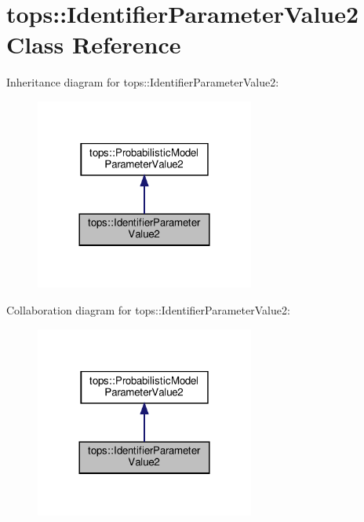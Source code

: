 \hypertarget{classtops_1_1IdentifierParameterValue2}{}\section{tops\+:\+:Identifier\+Parameter\+Value2 Class Reference}
\label{classtops_1_1IdentifierParameterValue2}


Inheritance diagram for tops\+:\+:Identifier\+Parameter\+Value2\+:
\nopagebreak
\begin{figure}[H]
\begin{center}
\leavevmode
\includegraphics[width=204pt]{classtops_1_1IdentifierParameterValue2__inherit__graph}
\end{center}
\end{figure}


Collaboration diagram for tops\+:\+:Identifier\+Parameter\+Value2\+:
\nopagebreak
\begin{figure}[H]
\begin{center}
\leavevmode
\includegraphics[width=204pt]{classtops_1_1IdentifierParameterValue2__coll__graph}
\end{center}
\end{figure}
